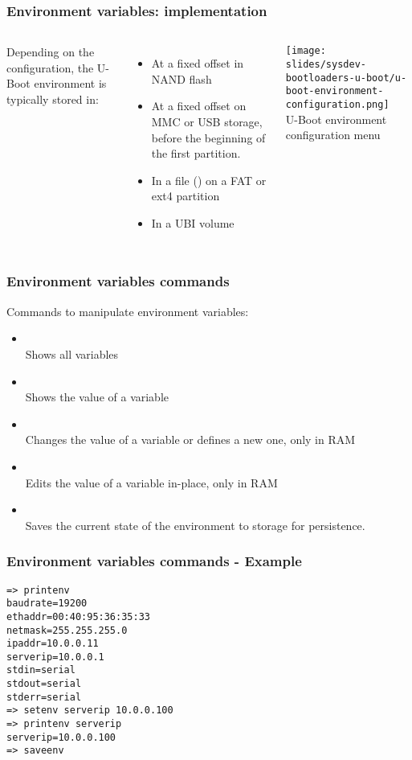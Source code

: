 \begin{frame}
  \frametitle{Environment variables: implementation}
  \begin{columns}
    Depending on the configuration, the U-Boot environment is typically stored in:
    \begin{itemize}
	  \item At a fixed offset in NAND flash
	  \item At a fixed offset on MMC or USB storage, before the beginning of
                the first partition.
	  \item In a file () on a FAT or ext4 partition
	  \item In a UBI volume
    \end{itemize}
    \texttt{[image: slides/sysdev-bootloaders-u-boot/u-boot-environment-configuration.png]}\\
    \vspace{0.3cm}
    \tiny U-Boot environment configuration menu
  \end{columns}
\end{frame}

\begin{frame}
  \frametitle{Environment variables commands}
  Commands to manipulate environment variables:
  \begin{itemize}
    \item {}\\
      Shows all variables
    \item {}\\
      Shows the value of a variable
    \item {}\\
      Changes the value of a variable or defines a new one, only in RAM
    \item {}\\
      Edits the value of a variable in-place, only in RAM
    \item {}\\
      Saves the current state of the environment to storage for persistence.
  \end{itemize}
\end{frame}

\begin{frame}[fragile]
\frametitle{Environment variables commands - Example}
\small
\begin{verbatim}
=> printenv
baudrate=19200
ethaddr=00:40:95:36:35:33
netmask=255.255.255.0
ipaddr=10.0.0.11
serverip=10.0.0.1
stdin=serial
stdout=serial
stderr=serial
=> setenv serverip 10.0.0.100
=> printenv serverip
serverip=10.0.0.100
=> saveenv
\end{verbatim}
\end{frame}

